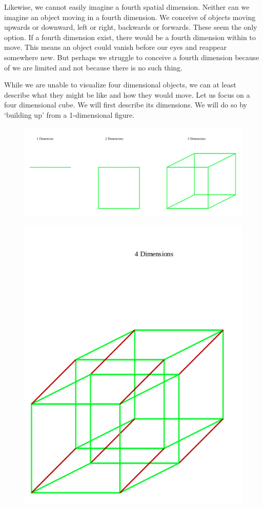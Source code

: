 \documentclass[oneside]{article}
\begin{document}
Likewise, we cannot easily imagine a fourth spatial dimension. Neither can we imagine an object moving in a fourth dimension. We conceive of objects moving upwards or downward, left or right, backwards or forwards. These seem the only option. If a fourth dimension exist, there would be a fourth dimension within to move. This means an object could vanish before our eyes and reappear somewhere new. But perhaps we struggle to conceive a fourth dimension because of we are limited and not because there is no such thing. 

While we are unable to  visualize four dimensional objects, we can at least describe what they might be like and how they would move. Let us focus on a four dimensional cube. We will first describe its dimensions. We will do so by `building up' from a 1-dimensional figure. 

\begin{figure}[h]
  \includegraphics[width=\linewidth]{dimensions.jpg}
\end{figure}


\begin{figure}[h]
  \includegraphics[width=\linewidth]{four.jpg}
\end{figure}
\end{document}
